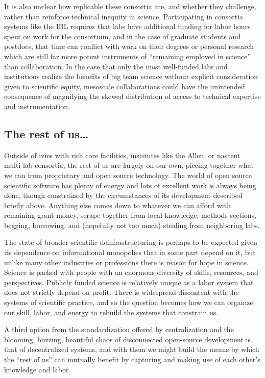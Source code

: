 \documentclass[10pt]{tufte-book}
\begin{document}
It is also unclear how replicable these consortia are, and whether they
challenge, rather than reinforce technical inequity in science.
Participating in consortia systems like the IBL requires that labs have
additional funding for labor hours spent on work for the consortium, and
in the case of graduate students and postdocs, that time can conflict
with work on their degrees or personal research which are still far more
potent instruments of ``remaining employed in science'' than
collaboration. In the case that only the most well-funded labs and
institutions realize the benefits of big team science without explicit
consideration given to scientific equity, mesoscale collaborations could
have the unintended consequence of magnifying the skewed distribution of
access to technical expertise and instrumentation.


\subsection{The rest of us\ldots{}}

Outside of ivies with rich core facilities, institutes like the Allen,
or nascent multi-lab consortia, the rest of us are largely on our own,
piecing together what we can from proprietary and open source
technology. The world of open source scientific software has plenty of
energy and lots of excellent work is always being done, though
constrained by the circumstances of its development described briefly
above. Anything else comes down to whatever we can afford with remaining
grant money, scrape together from local knowledge, methods sections,
begging, borrowing, and (hopefully not too much) stealing from
neighboring labs.

The state of broader scientific deinfrastructuring is perhaps to be
expected given its dependence on informational monopolies that in some
part depend on it, but unlike many other industries or professions there
is reason for hope in science. Science is packed with people with an
enormous diversity of skills, resources, and perspectives. Publicly
funded science is relatively unique as a labor system that does not
strictly depend on profit. There is widespread discontent with the
systems of scientific practice, and so the question becomes how we can
organize our skill, labor, and energy to rebuild the systems that
constrain us.

A third option from the standardization offered by centralization and
the blooming, buzzing, beautiful chaos of disconnected open-source
development is that of decentralized systems, and with them we might
build the means by which the ``rest of us'' can mutually benefit by
capturing and making use of each other's knowledge and labor.
\end{document}

